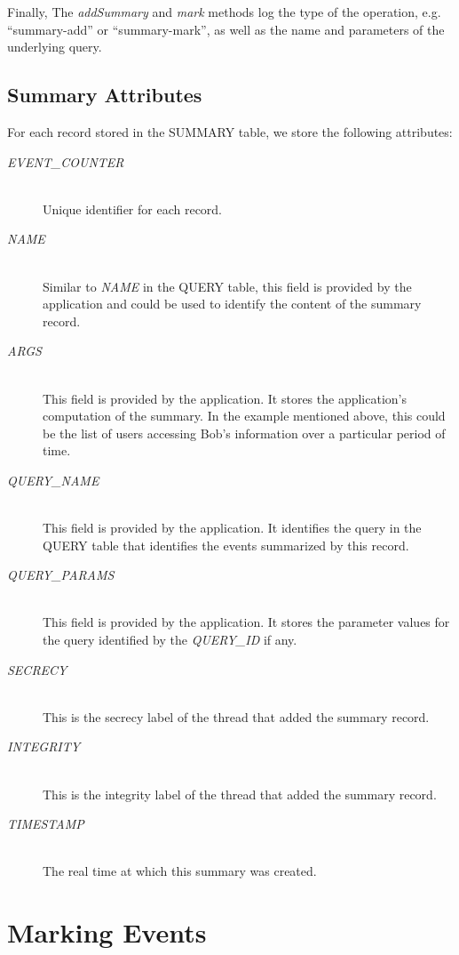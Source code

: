 Finally, The \emph{addSummary} and \emph{mark} methods log the type of the operation, e.g. ``summary-add'' or ``summary-mark'', as well as the name and parameters of the underlying query.

\subsection{Summary Attributes}

For each record stored in the SUMMARY table, we store the following attributes:

\begin{description}
  \item[\emph{EVENT\_COUNTER}] \ \\
    Unique identifier for each record.
  \item[\emph{NAME}] \ \\
    Similar to \emph{NAME} in the QUERY table,
    this field is provided by the application and
    could be used to identify the content of the
    summary record.
  \item[\emph{ARGS}] \ \\
    This field is provided by the application.
    It stores the application's computation of the summary.
    In the example mentioned above, this could be the 
    list of users accessing Bob's information over a 
    particular period of time.
  \item[\emph{QUERY\_NAME}] \ \\
    This field is provided by the application.
    It identifies the query in the QUERY table
    that identifies the events summarized
    by this record.
  \item[\emph{QUERY\_PARAMS}] \ \\
    This field is provided by the application.
    It stores the parameter values for the query
    identified by the \emph{QUERY\_ID} if any.
  \item[\emph{SECRECY}] \ \\
    This is the secrecy label of the thread 
    that added the summary record.
  \item[\emph{INTEGRITY}] \ \\
    This is the integrity label of the thread 
    that added the summary record.
  \item[\emph{TIMESTAMP}] \ \\
    The real time at which this summary was created.
\end{description}

\section{Marking Events}


